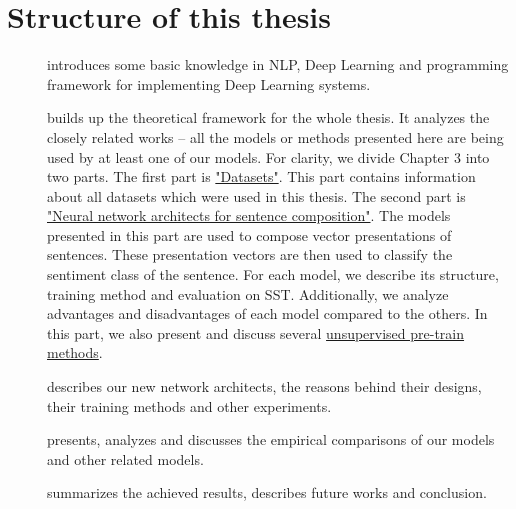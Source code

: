 \section{Structure of this thesis}
\begin{description}
\item [] introduces some basic knowledge in NLP, Deep Learning and programming framework for implementing Deep Learning systems.
\item [] builds up the theoretical framework for the whole thesis.
It analyzes the closely related works -- all the models or methods presented here are being used by at least one of our models.
For clarity, we divide Chapter 3 into two parts.
The first part is \hyperref[sec:dataset]{"Datasets"}.
This part contains information about all datasets which were used in this thesis.
The second part is \hyperref[sec:composer]{"Neural network architects for sentence composition"}.
The models presented in this part are used to compose vector presentations of sentences.
These presentation vectors are then used to classify the sentiment class of the sentence.
For each model, we describe its structure, training method and evaluation on SST.
Additionally, we analyze advantages and disadvantages of each model compared to the others.
In this part, we also present and discuss several \hyperref[sec:unsupervised-pretrain]{unsupervised pre-train methods}.
\item [] describes our new network architects, the reasons behind their designs, their training methods and other experiments.
\item [] presents, analyzes and discusses the empirical comparisons of our models and other related models.
\item [] summarizes the achieved results, describes future works and conclusion.
\end{description}

